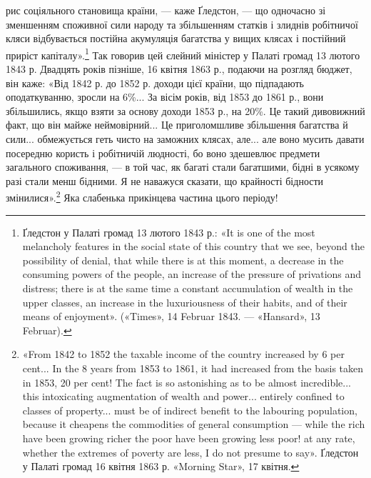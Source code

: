\parcont{}  %
рис соціяльного становища країни, — каже Ґледстон, — що одночасно
зі зменшенням споживної сили народу та збільшенням
статків і злиднів робітничої кляси відбувається постійна акумуляція
багатства у вищих клясах і постійний приріст капіталу».\footnote{
Ґледстон у Палаті громад 13 лютого 1843 р.: «It is one of the
most melancholy features in the social state of this country that we see,
beyond the possibility of denial, that while there is at this moment, a decrease
in the consuming powers of the people, an increase of the pressure
of privations and distress; there is at the same time a constant accumulation
of wealth in the upper classes, an increase in the luxuriousness of their
habits, and of their means of enjoyment». («Times», 14 Februar 1843. —
«Hansard», 13 Februar).
} Так говорив цей єлейний міністер у Палаті громад
13 лютого 1843 р. Двадцять років пізніше, 16 квітня 1863 р.,
подаючи на розгляд бюджет, він каже: «Від 1842 р. до 1852 р.
доходи цієї країни, що підпадають оподаткуванню, зросли на
6\%... За вісім років, від 1853 до 1861 р., вони збільшились, якщо
взяти за основу доходи 1853 р., на 20\%. Це такий дивовижний
факт, що він майже неймовірний... Це приголомшливе збільшення
багатства й сили... обмежується геть чисто на заможних
клясах, але... але воно мусить давати посередню користь і робітничій
людності, бо воно здешевлює предмети загального споживання,
— в той час, як багаті стали багатшими, бідні в усякому
разі стали менш бідними. Я не наважуся сказати, що крайності
бідности змінилися».\footnote{
«From 1842 to 1852 the taxable income of the country increased by
6 per cent... In the 8 years from 1853 to 1861, it had increased from the
basis taken in 1853, 20 per cent! The fact is so astonishing as to be almost
incredible... this intoxicating augmentation of wealth and power... entirely
confined to classes of property... must be of indirect benefit to the
labouring population, because it cheapens the commodities of general consumption
— while the rich have been growing richer the poor have been
growing less poor! at any rate, whether the extremes of poverty are less,
I do not presume to say». Ґледстон у Палаті громад 16 квітня 1863 р.
«Morning Star», 17 квітня.
} Яка слабенька прикінцева частина цього
періоду!

